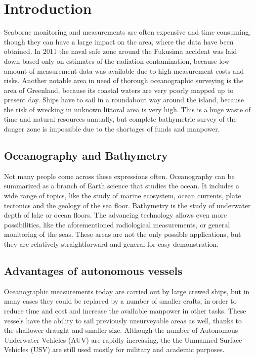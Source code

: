 \section{Introduction}

Seaborne monitoring and measurements are often expensive and time consuming, though they can have a large impact on the area, where the data have been obtained. In 2011 the naval safe zone around the Fukusima accident was laid down based only on estimates of the radiation contamination\cite{fukushima}, because low amount of measurement data was available due to high measurement costs and risks. Another notable area in need of thorough oceanographic surveying is the area of Greenland, because its coastal waters are very poorly mapped up to present day\cite{2009AGUFMOS21A1152W}. Ships have to sail in a roundabout way around the island, because the risk of wrecking in unknown littoral area is very high. This is a huge waste of time and natural resources annually, but complete bathymetric survey of the danger zone is impossible due to the shortages of funds and manpower.

\subsection*{Oceanography and Bathymetry}

Not many people come across these expressions often. Oceanography can be summarized as a branch of Earth science that studies the ocean. It includes a wide range of topics, like the study of marine ecosystem, ocean currents, plate tectonics and the geology of the sea floor. Bathymetry is the study of underwater depth of lake or ocean floors. The advancing technology allows even more possibilities, like the aforementioned radiological measurements, or general monitoring of the seas. These areas are not the only possible applications, but they are relatively straightforward and general for easy demonstration.

\subsection*{Advantages of autonomous vessels}

Oceanographic measurements today are carried out by large crewed ships, but in many cases they could be replaced by a number of smaller crafts, in order to reduce time and cost and increase the available manpower in other tasks. These vessels have the ability to sail previously unsurveyable areas as well, thanks to the shallower draught and smaller size. Although the number of Autonomous Underwater Vehicles (AUV) are rapidly increasing\cite{AUV_growth}, the the Unmanned Surface Vehicles (USV) are still used mostly for military and academic purposes\cite{USV_applications}.

